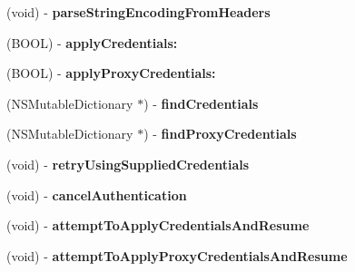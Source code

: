 \begin{DoxyCompactItemize}
\item 
\hypertarget{interface_a_s_i_h_t_t_p_request_a4820891389ebf2eda587ff809b0e6bc2}{
(void) -\/ {\bfseries parse\-String\-Encoding\-From\-Headers}}
\label{interface_a_s_i_h_t_t_p_request_a4820891389ebf2eda587ff809b0e6bc2}

\item 
\hypertarget{interface_a_s_i_h_t_t_p_request_ade60b6e81c57c8ee8b616200ccb22930}{
(\-B\-O\-O\-L) -\/ {\bfseries apply\-Credentials\-:}}
\label{interface_a_s_i_h_t_t_p_request_ade60b6e81c57c8ee8b616200ccb22930}

\item 
\hypertarget{interface_a_s_i_h_t_t_p_request_a53e09e81268eb7230b4b5498ed2eb7d1}{
(\-B\-O\-O\-L) -\/ {\bfseries apply\-Proxy\-Credentials\-:}}
\label{interface_a_s_i_h_t_t_p_request_a53e09e81268eb7230b4b5498ed2eb7d1}

\item 
\hypertarget{interface_a_s_i_h_t_t_p_request_af337cbd50189506479260c6069ca2ded}{
(\-N\-S\-Mutable\-Dictionary $\ast$) -\/ {\bfseries find\-Credentials}}
\label{interface_a_s_i_h_t_t_p_request_af337cbd50189506479260c6069ca2ded}

\item 
\hypertarget{interface_a_s_i_h_t_t_p_request_aee0699cfb5ba5749a1461dfa56440121}{
(\-N\-S\-Mutable\-Dictionary $\ast$) -\/ {\bfseries find\-Proxy\-Credentials}}
\label{interface_a_s_i_h_t_t_p_request_aee0699cfb5ba5749a1461dfa56440121}

\item 
\hypertarget{interface_a_s_i_h_t_t_p_request_aad1efa3b1bc64006cc033bd0d4eee7cc}{
(void) -\/ {\bfseries retry\-Using\-Supplied\-Credentials}}
\label{interface_a_s_i_h_t_t_p_request_aad1efa3b1bc64006cc033bd0d4eee7cc}

\item 
\hypertarget{interface_a_s_i_h_t_t_p_request_a25d3d77f917c5f8b9956f6a45022dae2}{
(void) -\/ {\bfseries cancel\-Authentication}}
\label{interface_a_s_i_h_t_t_p_request_a25d3d77f917c5f8b9956f6a45022dae2}

\item 
\hypertarget{interface_a_s_i_h_t_t_p_request_ad3da0a488faf41101bbf73a8071456e8}{
(void) -\/ {\bfseries attempt\-To\-Apply\-Credentials\-And\-Resume}}
\label{interface_a_s_i_h_t_t_p_request_ad3da0a488faf41101bbf73a8071456e8}

\item 
\hypertarget{interface_a_s_i_h_t_t_p_request_a03ce363e92c2d5dbe7229f021b0230a5}{
(void) -\/ {\bfseries attempt\-To\-Apply\-Proxy\-Credentials\-And\-Resume}}
\label{interface_a_s_i_h_t_t_p_request_a03ce363e92c2d5dbe7229f021b0230a5}


\end{DoxyCompactItemize}
